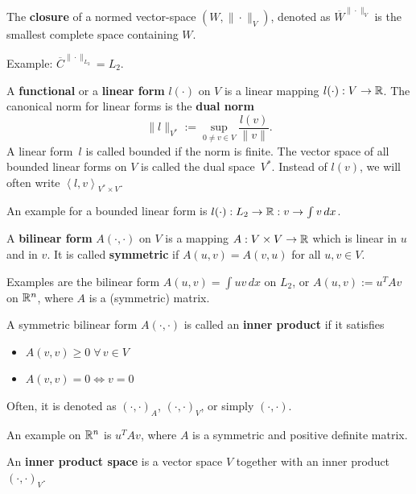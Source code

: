 \begin{definition} The {\bf closure} of a normed vector-space $(W, \| \cdot \|_V)$,
denoted as $\overline{W}^{\| \cdot \|_V}$ is the smallest complete space containing $W$.
\end{definition}
Example: $\overline{ C }^{\| \cdot \|_{L_2}} = L_2$.


\begin{definition} A {\bf functional} or a {\bf linear form} $l(\cdot)$ on $V$ is a linear mapping 
$l(\cdot) : V \rightarrow {\mathbb R}$. 
The canonical norm for linear forms is the {\bf dual norm}
$$
\| l \|_{V^\ast} := \sup_{0 \neq v \in V} \frac{l(v)}{\|v\|}.
$$
A linear form~$l$ is called bounded if the norm is finite.
The vector space of all bounded linear forms on $V$ is called the 
dual space~$V^\ast$.
Instead of $l(v)$, we will often write $\left< l , v \right>_{V^\ast \times V}$.
\end{definition}

\noindent
An example for a bounded linear form is 
$l(\cdot) : L_2 \rightarrow {\mathbb R} : v \rightarrow \int v \, dx$.

\begin{definition} A {\bf bilinear form} $A(\cdot,\cdot)$ on $V$ is a mapping
$A : V \times V \rightarrow {\mathbb R}$ which is linear in $u$ and in $v$. It 
is called {\bf symmetric} if $A(u,v) = A(v,u)$ for all $u,v \in V$.
\end{definition}
\noindent
Examples are the bilinear form $A(u,v) = \int u v \, dx$ on $L_2$, or 
$A(u,v) := u^T A v$ on ${\mathbb R}^n$, where $A$ is a (symmetric) matrix.


\begin{definition} A symmetric bilinear form $A(\cdot,\cdot)$ is 
called an {\bf inner product} if it satisfies
\begin{itemize}
\item$A(v,v) \geq 0 \; \forall  \, v \in V$
\item$A(v,v) = 0 \Leftrightarrow v = 0$
\end{itemize}
Often, it is denoted as $(\cdot,\cdot)_A$, $(\cdot,\cdot)_V$, or simply $(\cdot,\cdot)$.
\end{definition}
\noindent
An example on ${\mathbb R}^n$ is $u^T A v$, where $A$ is a symmetric and positive
definite matrix.

\begin{definition} An {\bf inner product space} is a vector space $V$ together
with an inner product $(\cdot, \cdot)_V$.
\end{definition}


